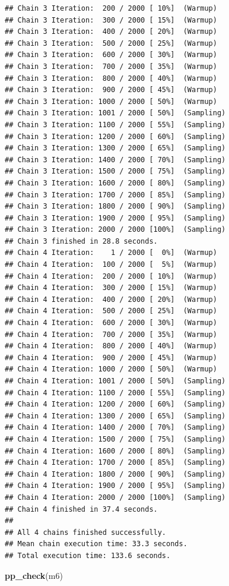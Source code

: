 \documentclass[
]{article}
\newenvironment{Shaded}{\begin{snugshade}}{\end{snugshade}}
\newcommand{\FunctionTok}[1]{\textcolor[rgb]{0.13,0.29,0.53}{\textbf{#1}}}
\newcommand{\NormalTok}[1]{#1}
\begin{document}
\begin{verbatim}
## Chain 3 Iteration:  200 / 2000 [ 10%]  (Warmup) 
## Chain 3 Iteration:  300 / 2000 [ 15%]  (Warmup) 
## Chain 3 Iteration:  400 / 2000 [ 20%]  (Warmup) 
## Chain 3 Iteration:  500 / 2000 [ 25%]  (Warmup) 
## Chain 3 Iteration:  600 / 2000 [ 30%]  (Warmup) 
## Chain 3 Iteration:  700 / 2000 [ 35%]  (Warmup) 
## Chain 3 Iteration:  800 / 2000 [ 40%]  (Warmup) 
## Chain 3 Iteration:  900 / 2000 [ 45%]  (Warmup) 
## Chain 3 Iteration: 1000 / 2000 [ 50%]  (Warmup) 
## Chain 3 Iteration: 1001 / 2000 [ 50%]  (Sampling) 
## Chain 3 Iteration: 1100 / 2000 [ 55%]  (Sampling) 
## Chain 3 Iteration: 1200 / 2000 [ 60%]  (Sampling) 
## Chain 3 Iteration: 1300 / 2000 [ 65%]  (Sampling) 
## Chain 3 Iteration: 1400 / 2000 [ 70%]  (Sampling) 
## Chain 3 Iteration: 1500 / 2000 [ 75%]  (Sampling) 
## Chain 3 Iteration: 1600 / 2000 [ 80%]  (Sampling) 
## Chain 3 Iteration: 1700 / 2000 [ 85%]  (Sampling) 
## Chain 3 Iteration: 1800 / 2000 [ 90%]  (Sampling) 
## Chain 3 Iteration: 1900 / 2000 [ 95%]  (Sampling) 
## Chain 3 Iteration: 2000 / 2000 [100%]  (Sampling) 
## Chain 3 finished in 28.8 seconds.
## Chain 4 Iteration:    1 / 2000 [  0%]  (Warmup) 
## Chain 4 Iteration:  100 / 2000 [  5%]  (Warmup) 
## Chain 4 Iteration:  200 / 2000 [ 10%]  (Warmup) 
## Chain 4 Iteration:  300 / 2000 [ 15%]  (Warmup) 
## Chain 4 Iteration:  400 / 2000 [ 20%]  (Warmup) 
## Chain 4 Iteration:  500 / 2000 [ 25%]  (Warmup) 
## Chain 4 Iteration:  600 / 2000 [ 30%]  (Warmup) 
## Chain 4 Iteration:  700 / 2000 [ 35%]  (Warmup) 
## Chain 4 Iteration:  800 / 2000 [ 40%]  (Warmup) 
## Chain 4 Iteration:  900 / 2000 [ 45%]  (Warmup) 
## Chain 4 Iteration: 1000 / 2000 [ 50%]  (Warmup) 
## Chain 4 Iteration: 1001 / 2000 [ 50%]  (Sampling) 
## Chain 4 Iteration: 1100 / 2000 [ 55%]  (Sampling) 
## Chain 4 Iteration: 1200 / 2000 [ 60%]  (Sampling) 
## Chain 4 Iteration: 1300 / 2000 [ 65%]  (Sampling) 
## Chain 4 Iteration: 1400 / 2000 [ 70%]  (Sampling) 
## Chain 4 Iteration: 1500 / 2000 [ 75%]  (Sampling) 
## Chain 4 Iteration: 1600 / 2000 [ 80%]  (Sampling) 
## Chain 4 Iteration: 1700 / 2000 [ 85%]  (Sampling) 
## Chain 4 Iteration: 1800 / 2000 [ 90%]  (Sampling) 
## Chain 4 Iteration: 1900 / 2000 [ 95%]  (Sampling) 
## Chain 4 Iteration: 2000 / 2000 [100%]  (Sampling) 
## Chain 4 finished in 37.4 seconds.
## 
## All 4 chains finished successfully.
## Mean chain execution time: 33.3 seconds.
## Total execution time: 133.6 seconds.
\end{verbatim}

\begin{Shaded}
\begin{Highlighting}[]
\FunctionTok{pp\_check}\NormalTok{(m6)}
\end{Highlighting}
\end{Shaded}
\end{document}
